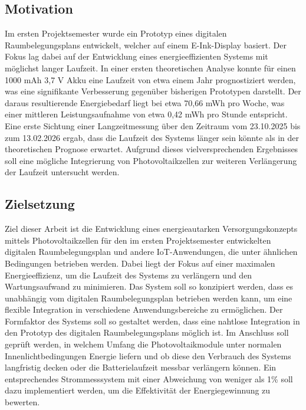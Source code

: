 \documentclass{article}
\begin{document}
\subsection{Motivation}

Im ersten Projektsemester wurde ein Prototyp eines digitalen Raumbelegungsplans entwickelt, welcher auf einem E-Ink-Display basiert. 
Der Fokus lag dabei auf der Entwicklung eines energieeffizienten Systems mit möglichst langer Laufzeit.
In einer ersten theoretischen Analyse konnte für einen 1000 mAh 3,7 V Akku eine Laufzeit von etwa einem Jahr prognostiziert werden, 
was eine signifikante Verbesserung gegenüber bisherigen Prototypen darstellt.
Der daraus resultierende Energiebedarf liegt bei etwa 70,66 mWh pro Woche, was einer mittleren Leistungsaufnahme von etwa 0,42 mWh pro Stunde entspricht. 
Eine erste Sichtung einer Langzeitmessung über den Zeitraum vom 23.10.2025 bis zum 13.02.2026 ergab, dass die Laufzeit des Systems länger 
sein könnte als in der theoretischen Prognose erwartet.
Aufgrund dieses vielversprechenden Ergebnisses soll eine mögliche Integrierung von Photovoltaikzellen zur weiteren Verlängerung der Laufzeit 
untersucht werden.

\subsection{Zielsetzung}

Ziel dieser Arbeit ist die Entwicklung eines energieautarken Versorgungskonzepts mittels Photovoltaikzellen für den im ersten Projektsemester 
entwickelten digitalen Raumbelegungsplan und andere IoT-Anwendungen, die unter ähnlichen Bedingungen betrieben werden. Dabei liegt der Fokus auf einer 
maximalen Energieeffizienz, um die Laufzeit des Systems zu verlängern und den Wartungsaufwand zu minimieren. Das System soll so konzipiert werden, 
dass es unabhängig vom digitalen Raumbelegungsplan betrieben werden kann, um eine flexible Integration in verschiedene Anwendungsbereiche zu ermöglichen. 
Der Formfaktor des Systems soll so gestaltet werden, dass eine nahtlose Integration in den Prototyp des digitalen Raumbelegungsplans möglich ist.
Im Anschluss soll geprüft werden, in welchem Umfang die Photovoltaikmodule unter normalen Innenlichtbedingungen Energie liefern und ob diese den 
Verbrauch des Systems langfristig decken oder die Batterielaufzeit messbar verlängern können. Ein entsprechendes Strommesssystem mit einer Abweichung 
von weniger als 1\% soll dazu implementiert werden, um die Effektivität der Energiegewinnung zu bewerten.
\end{document}
